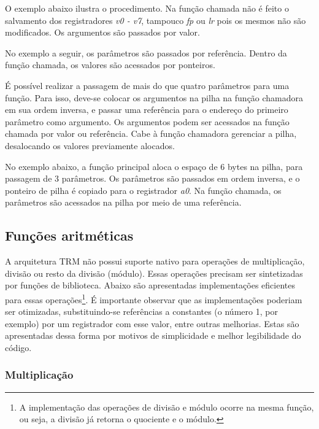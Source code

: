 \documentclass[11pt,a4paper]{report}
\begin{document}
O exemplo abaixo ilustra o procedimento. Na função chamada não é feito
o salvamento dos registradores \textit{v0 - v7}, tampouco \textit{fp}
ou \textit{lr} pois os mesmos não são modificados. Os argumentos são
passados por valor.



No exemplo a seguir, os parâmetros são passados por referência. Dentro
da função chamada, os valores são acessados por ponteiros.



É possível realizar a passagem de mais do que quatro parâmetros para
uma função. Para isso, deve-se colocar os argumentos na pilha na função
chamadora em sua ordem inversa, e passar uma referência para o endereço
do primeiro parâmetro como argumento. Os argumentos podem ser acessados
na função chamada por valor ou referência. Cabe à função chamadora
gerenciar a pilha, desalocando os valores previamente alocados.

No exemplo abaixo, a função principal aloca o espaço de 6 bytes na
pilha, para passagem de 3 parâmetros. Os parâmetros são passados em
ordem inversa, e o ponteiro de pilha é copiado para o registrador
\textit{a0}. Na função chamada, os parâmetros são acessados na pilha
por meio de uma referência.



\subsection{Funções aritméticas}

A arquitetura TRM não possui suporte nativo para operações de multiplicação,
divisão ou resto da divisão (módulo). Essas operações precisam ser
sintetizadas por funções de biblioteca. Abaixo são apresentadas
implementações eficientes para essas operações\footnote{A implementação
das operações de divisão e módulo ocorre na mesma função, ou seja, a
divisão já retorna o quociente e o módulo.}. É importante observar que
as implementações poderiam ser otimizadas, substituindo-se referências
a constantes (o número 1, por exemplo) por um registrador com esse valor,
entre outras melhorias. Estas são apresentadas dessa forma por motivos
de simplicidade e melhor legibilidade do código.

\subsubsection{Multiplicação}
\end{document}
